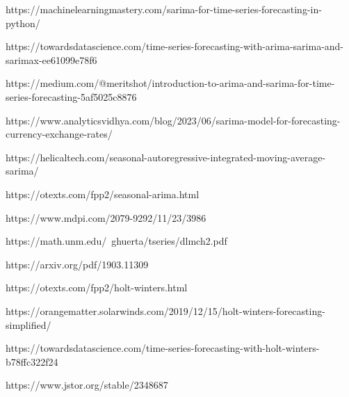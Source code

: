 \documentclass{ieeeojies}
\begin{document}
\begin{thebibliography}{00}
 https://machinelearningmastery.com/sarima-for-time-series-forecasting-in-python/

 https://towardsdatascience.com/time-series-forecasting-with-arima-sarima-and-sarimax-ee61099e78f6

 https://medium.com/@meritshot/introduction-to-arima-and-sarima-for-time-series-forecasting-5af5025c8876

 https://www.analyticsvidhya.com/blog/2023/06/sarima-model-for-forecasting-currency-exchange-rates/

 https://helicaltech.com/seasonal-autoregressive-integrated-moving-average-sarima/

 https://otexts.com/fpp2/seasonal-arima.html

 https://www.mdpi.com/2079-9292/11/23/3986

 https://math.unm.edu/~ghuerta/tseries/dlmch2.pdf

 https://arxiv.org/pdf/1903.11309

 https://otexts.com/fpp2/holt-winters.html

 https://orangematter.solarwinds.com/2019/12/15/holt-winters-forecasting-simplified/

 https://towardsdatascience.com/time-series-forecasting-with-holt-winters-b78ffc322f24

 https://www.jstor.org/stable/2348687

\end{thebibliography}









\EOD
\end{document}
